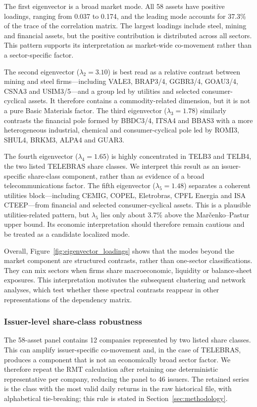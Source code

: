 The first eigenvector is a broad market mode. All 58 assets have positive loadings, ranging from 0.037 to 0.174, and the leading mode accounts for 37.3\% of the trace of the correlation matrix. The largest loadings include steel, mining and financial assets, but the positive contribution is distributed across all sectors. This pattern supports its interpretation as market-wide co-movement rather than a sector-specific factor.

The second eigenvector ($\lambda_2=3.10$) is best read as a relative contrast between mining and steel firms---including VALE3, BRAP3/4, GGBR3/4, GOAU3/4, CSNA3 and USIM3/5---and a group led by utilities and selected consumer-cyclical assets. It therefore contains a commodity-related dimension, but it is not a pure Basic Materials factor. The third eigenvector ($\lambda_3=1.78$) similarly contrasts the financial pole formed by BBDC3/4, ITSA4 and BBAS3 with a more heterogeneous industrial, chemical and consumer-cyclical pole led by ROMI3, SHUL4, BRKM3, ALPA4 and GUAR3.

The fourth eigenvector ($\lambda_4=1.65$) is highly concentrated in TELB3 and TELB4, the two listed TELEBRAS share classes. We interpret this result as an issuer-specific share-class component, rather than as evidence of a broad telecommunications factor. The fifth eigenvector ($\lambda_5=1.48$) separates a coherent utilities block---including CEMIG, COPEL, Eletrobras, CPFL Energia and ISA CTEEP---from financial and selected consumer-cyclical assets. This is a plausible utilities-related pattern, but $\lambda_5$ lies only about 3.7\% above the Mar\v{c}enko--Pastur upper bound. Its economic interpretation should therefore remain cautious and be treated as a candidate localized mode.

Overall, Figure~\ref{fig:eigenvector_loadings} shows that the modes beyond the market component are structured contrasts, rather than one-sector classifications. They can mix sectors when firms share macroeconomic, liquidity or balance-sheet exposures. This interpretation motivates the subsequent clustering and network analyses, which test whether these spectral contrasts reappear in other representations of the dependency matrix.

\subsubsection{Issuer-level share-class robustness}

The 58-asset panel contains 12 companies represented by two listed share classes. This can amplify issuer-specific co-movement and, in the case of TELEBRAS, produces a component that is not an economically broad sector factor. We therefore repeat the RMT calculation after retaining one deterministic representative per company, reducing the panel to 46 issuers. The retained series is the class with the most valid daily returns in the raw historical file, with alphabetical tie-breaking; this rule is stated in Section~\ref{sec:methodology}.

